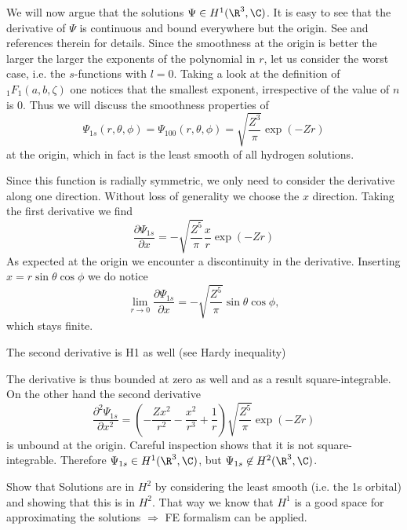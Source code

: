 We will now argue that the solutions $\Psi \in H^1(\R^3, \C)$.
It is easy to see that the derivative of $\Psi$ is continuous and bound
everywhere but the origin.
See \cite{Kato1957} and references therein for details.
Since the smoothness at the origin is better the larger
the larger the exponents of the polynomial in $r$,
let us consider the worst case, i.e. the $s$-functions with $l = 0$.
Taking a look at the definition of $_1F_1(a,b,\zeta)$
one notices that the smallest exponent, irrespective of the value of $n$ is $0$.
Thus we will discuss the smoothness properties of
\[
	\Psi_{1s}(r, \theta, \phi) = \Psi_{100}(r, \theta, \phi)
	= \sqrt{\frac{Z^3}{\pi}} \exp(-Z r)
\]
at the origin,
which in fact is the least smooth of all hydrogen solutions.

Since this function is radially symmetric,
we only need to consider the derivative along one direction.
Without loss of generality we choose the $x$ direction.
Taking the first derivative we find
\[
	\frac{\partial \Psi_{1s}}{\partial x} = -\sqrt{\frac{Z^5}{\pi}} \frac{x}{r} \exp(-Z r)
\]
As expected at the origin we encounter a discontinuity in the derivative.
Inserting $x = r \sin\theta \cos \phi$ we do notice
\[
	\lim_{r \to 0} \frac{\partial \Psi_{1s}}{\partial x} = -\sqrt{\frac{Z^5}{\pi}} \sin\theta \cos \phi,
\]
which stays finite.

The second derivative is H1 as well (see Hardy inequality)


The derivative is thus bounded at zero as well
and as a result square-integrable.
On the other hand the second derivative
\[
	\frac{\partial^2 \Psi_{1s}}{\partial x^2}
	= \left( -\frac{Z x^2}{r^2} -\frac{x^2}{r^3} + \frac{1}{r} \right)
		\sqrt{\frac{Z^5}{\pi}} \exp(-Z r)
\]
is unbound at the origin.
Careful inspection shows that it is not square-integrable.
Therefore $\Psi_{1s} \in H^1(\R^3,\C)$, but $\Psi_{1s} \not\in H^2(\R^3, \C)$.







Show that Solutions are in $H^2$ by considering
the least smooth (i.e. the 1s orbital) and showing that this
is in $H^2$.
That way we know that $H^1$ is a good space for approximating the solutions
$\Rightarrow$ FE formalism can be applied.





